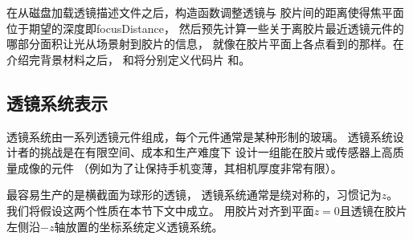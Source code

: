 在从磁盘加载透镜描述文件之后，构造函数调整透镜与
胶片间的距离使得焦平面位于期望的深度即{\ttfamily focusDistance}，
然后预先计算一些关于离胶片最近透镜元件的哪部分面积让光从场景射到胶片的信息，
就像在胶片平面上各点看到的那样。在介绍完背景材料之后，
和将分别定义代码片
和。

\subsection{透镜系统表示}\label{sub:透镜系统表示}
透镜系统由一系列透镜元件组成，每个元件通常是某种形制的玻璃。
透镜系统设计者的挑战是在有限空间、成本和生产难度下
设计一组能在胶片或传感器上高质量成像的元件
（例如为了让保持手机变薄，其相机厚度非常有限）。

最容易生产的是横截面为球形的透镜，
透镜系统通常是绕对称的，习惯记为$z$。
我们将假设这两个性质在本节下文中成立。
用胶片对齐到平面$z=0$且透镜在胶片左侧沿$-z$轴放置的坐标系统定义透镜系统。

